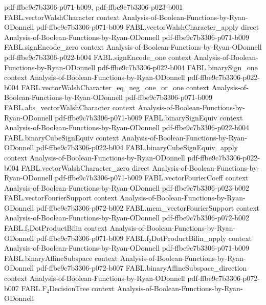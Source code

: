 \begin{theorem}
  {pdf-ffbe9c7b3306-p071-b009,
    pdf-ffbe9c7b3306-p023-b001}
\proofstep
  {FABL.vectorWalshCharacter}
  {context}
  {Analysis-of-Boolean-Functions-by-Ryan-ODonnell}
  {pdf-ffbe9c7b3306-p071-b009}
\proofstep
  {FABL.vectorWalshCharacter_apply}
  {direct}
  {Analysis-of-Boolean-Functions-by-Ryan-ODonnell}
  {pdf-ffbe9c7b3306-p071-b009}
\proofstep
  {FABL.signEncode_zero}
  {context}
  {Analysis-of-Boolean-Functions-by-Ryan-ODonnell}
  {pdf-ffbe9c7b3306-p022-b004}
\proofstep
  {FABL.signEncode_one}
  {context}
  {Analysis-of-Boolean-Functions-by-Ryan-ODonnell}
  {pdf-ffbe9c7b3306-p022-b004}
\proofstep
  {FABL.binarySign_one}
  {context}
  {Analysis-of-Boolean-Functions-by-Ryan-ODonnell}
  {pdf-ffbe9c7b3306-p022-b004}
\proofstep
  {FABL.vectorWalshCharacter_eq_neg_one_or_one}
  {context}
  {Analysis-of-Boolean-Functions-by-Ryan-ODonnell}
  {pdf-ffbe9c7b3306-p071-b009}
\proofstep
  {FABL.abs_vectorWalshCharacter}
  {context}
  {Analysis-of-Boolean-Functions-by-Ryan-ODonnell}
  {pdf-ffbe9c7b3306-p071-b009}
\proofstep
  {FABL.binarySignEquiv}
  {context}
  {Analysis-of-Boolean-Functions-by-Ryan-ODonnell}
  {pdf-ffbe9c7b3306-p022-b004}
\proofstep
  {FABL.binaryCubeSignEquiv}
  {context}
  {Analysis-of-Boolean-Functions-by-Ryan-ODonnell}
  {pdf-ffbe9c7b3306-p022-b004}
\proofstep
  {FABL.binaryCubeSignEquiv_apply}
  {context}
  {Analysis-of-Boolean-Functions-by-Ryan-ODonnell}
  {pdf-ffbe9c7b3306-p022-b004}
\proofstep
  {FABL.vectorWalshCharacter_zero}
  {direct}
  {Analysis-of-Boolean-Functions-by-Ryan-ODonnell}
  {pdf-ffbe9c7b3306-p071-b009}
\proofstep
  {FABL.vectorFourierCoeff}
  {context}
  {Analysis-of-Boolean-Functions-by-Ryan-ODonnell}
  {pdf-ffbe9c7b3306-p023-b002}
\proofstep
  {FABL.vectorFourierSupport}
  {context}
  {Analysis-of-Boolean-Functions-by-Ryan-ODonnell}
  {pdf-ffbe9c7b3306-p072-b002}
\proofstep
  {FABL.mem_vectorFourierSupport}
  {context}
  {Analysis-of-Boolean-Functions-by-Ryan-ODonnell}
  {pdf-ffbe9c7b3306-p072-b002}
\proofstep
  {FABL.f₂DotProductBilin}
  {context}
  {Analysis-of-Boolean-Functions-by-Ryan-ODonnell}
  {pdf-ffbe9c7b3306-p071-b009}
\proofstep
  {FABL.f₂DotProductBilin_apply}
  {context}
  {Analysis-of-Boolean-Functions-by-Ryan-ODonnell}
  {pdf-ffbe9c7b3306-p071-b009}
\proofstep
  {FABL.binaryAffineSubspace}
  {context}
  {Analysis-of-Boolean-Functions-by-Ryan-ODonnell}
  {pdf-ffbe9c7b3306-p072-b007}
\proofstep
  {FABL.binaryAffineSubspace_direction}
  {context}
  {Analysis-of-Boolean-Functions-by-Ryan-ODonnell}
  {pdf-ffbe9c7b3306-p072-b007}
\proofstep
  {FABL.F₂DecisionTree}
  {context}
  {Analysis-of-Boolean-Functions-by-Ryan-ODonnell}

\end{theorem}
